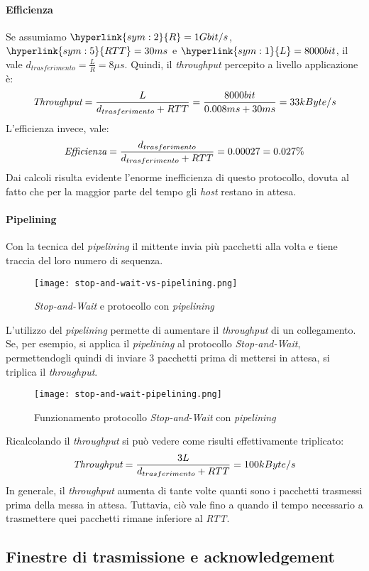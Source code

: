 \paragraph{Efficienza}
Se assumiamo $\hyperlink{sym:2}{R}=1Gbit/s$, $\hyperlink{sym:5}{RTT}=30ms$ e
$\hyperlink{sym:1}{L}=8000bit$, il  vale $d_{trasferimento}=
\frac{L}{R}=8\mu s$. Quindi, il \emph{throughput} percepito a livello applicazione
è:
\[\emph{Throughput}=\frac{L}{d_{trasferimento}+RTT}=\frac{8000bit}{0.008ms+30ms}=33kByte/s\]
L'efficienza invece, vale:
\[\emph{Efficienza}=\frac{d_{trasferimento}}{d_{trasferimento}+RTT}=0.00027=0.027\%\]
Dai calcoli risulta evidente l'enorme inefficienza di questo protocollo, dovuta
al fatto che per la maggior parte del tempo gli \emph{host} restano in attesa.

\paragraph{Pipelining}
Con la tecnica del \emph{pipelining} il mittente invia più pacchetti alla volta
e tiene traccia del loro numero di sequenza.

\begin{figure}[h!]
    \centering
    \texttt{[image: stop-and-wait-vs-pipelining.png]}
    \caption{\emph{Stop-and-Wait} e protocollo con \emph{pipelining}}
\end{figure}\noindent
L'utilizzo del \emph{pipelining} permette di aumentare il \emph{throughput} di un
collegamento. Se, per esempio, si applica il \emph{pipelining} al protocollo
\emph{Stop-and-Wait}, permettendogli quindi di inviare 3 pacchetti prima di
mettersi in attesa, si triplica il \emph{throughput}.

\newpage
\begin{figure}[ht]
    \centering
    \texttt{[image: stop-and-wait-pipelining.png]}
    \caption{Funzionamento protocollo \emph{Stop-and-Wait} con \emph{pipelining}}
\end{figure}\noindent
Ricalcolando il \emph{throughput} si può vedere come risulti effettivamente
triplicato:
\[\emph{Throughput}=\frac{3L}{d_{trasferimento}+RTT}=100kByte/s\]
In generale, il \emph{throughput} aumenta di tante volte quanti sono i pacchetti
trasmessi prima della messa in attesa. Tuttavia, ciò vale fino a quando il tempo
necessario a trasmettere quei pacchetti rimane inferiore al \emph{RTT}.

\subsection{Finestre di trasmissione e acknowledgement}
